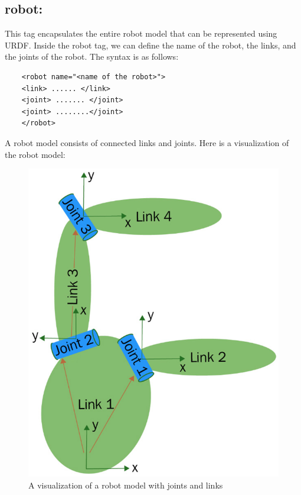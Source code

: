 \documentclass[../../main]{subfiles}
\begin{document}
\subsection{robot:}
This tag encapsulates the entire robot model that can be represented using
URDF. Inside the robot tag, we can define the name of the robot, the links, and the
joints of the robot.
The syntax is as follows:
\\

\begin{verbatim}
    <robot name="<name of the robot>">
    <link> ...... </link>
    <joint> ....... </joint>
    <joint> ........</joint>
    </robot>
\end{verbatim}
A robot model consists of connected links and joints. Here is a visualization of the
robot model:
\begin{figure}[ht]
    \centering
    \includegraphics{sublatex/hashem/img/robot1.jpg}
    \caption{A visualization of a robot model with joints and links\cite{joseph2018mastering}}
\end{figure}
\end{document}
